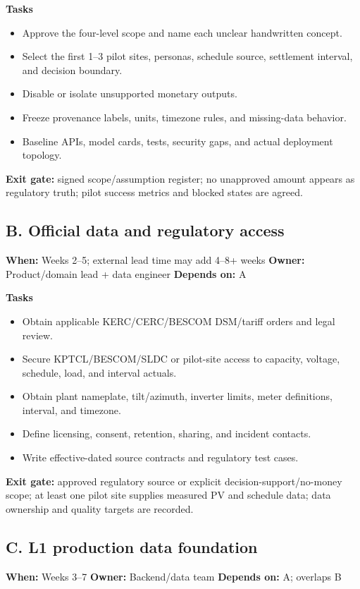\documentclass[11pt,a4paper]{article}
\begin{document}
\textbf{Tasks}
\begin{itemize}
  \item Approve the four-level scope and name each unclear handwritten concept.
  \item Select the first 1--3 pilot sites, personas, schedule source, settlement interval,
        and decision boundary.
  \item Disable or isolate unsupported monetary outputs.
  \item Freeze provenance labels, units, timezone rules, and missing-data behavior.
  \item Baseline APIs, model cards, tests, security gaps, and actual deployment topology.
\end{itemize}
\textbf{Exit gate:} signed scope/assumption register; no unapproved amount appears as regulatory
truth; pilot success metrics and blocked states are agreed.

\subsection{B. Official data and regulatory access}
\textbf{When:} Weeks 2--5; external lead time may add 4--8+ weeks \quad
\textbf{Owner:} Product/domain lead + data engineer \quad
\textbf{Depends on:} A

\textbf{Tasks}
\begin{itemize}
  \item Obtain applicable KERC/CERC/BESCOM DSM/tariff orders and legal review.
  \item Secure KPTCL/BESCOM/SLDC or pilot-site access to capacity, voltage, schedule, load,
        and interval actuals.
  \item Obtain plant nameplate, tilt/azimuth, inverter limits, meter definitions, interval,
        and timezone.
  \item Define licensing, consent, retention, sharing, and incident contacts.
  \item Write effective-dated source contracts and regulatory test cases.
\end{itemize}
\textbf{Exit gate:} approved regulatory source or explicit decision-support/no-money scope;
at least one pilot site supplies measured PV and schedule data; data ownership and quality
targets are recorded.

\subsection{C. L1 production data foundation}
\textbf{When:} Weeks 3--7 \quad
\textbf{Owner:} Backend/data team \quad
\textbf{Depends on:} A; overlaps B
\end{document}
